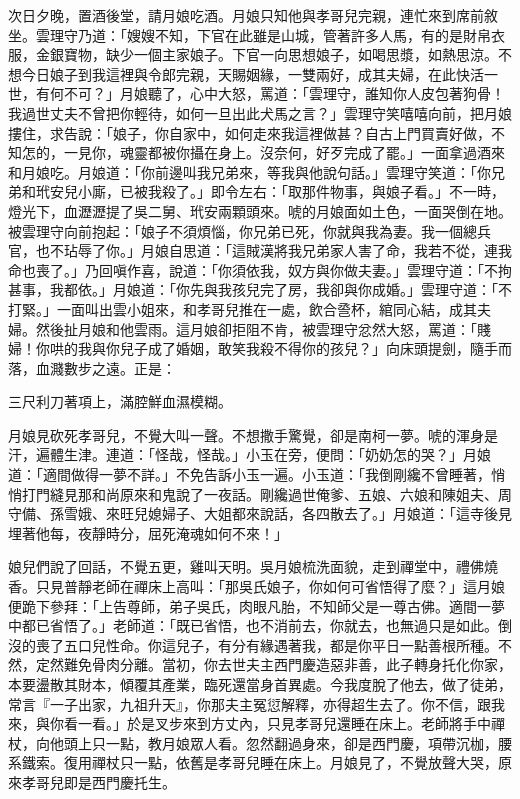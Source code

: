 次日夕晚，置酒後堂，請月娘吃酒。月娘只知他與孝哥兒完親，連忙來到席前敘坐。雲理守乃道：「嫂嫂不知，下官在此雖是山城，管著許多人馬，有的是財帛衣服，金銀寶物，缺少一個主家娘子。下官一向思想娘子，如喝思漿，如熱思涼。不想今日娘子到我這裡與令郎完親，天賜姻緣，一雙兩好，成其夫婦，在此快活一世，有何不可？」月娘聽了，心中大怒，罵道：「雲理守，誰知你人皮包著狗骨！我過世丈夫不曾把你輕待，如何一旦出此犬馬之言？」雲理守笑嘻嘻向前，把月娘摟住，求告說：「娘子，你自家中，如何走來我這裡做甚？自古上門買賣好做，不知怎的，一見你，魂靈都被你攝在身上。沒奈何，好歹完成了罷。」一面拿過酒來和月娘吃。月娘道：「你前邊叫我兄弟來，等我與他說句話。」雲理守笑道：「你兄弟和玳安兒小廝，已被我殺了。」即令左右：「取那件物事，與娘子看。」不一時，燈光下，血瀝瀝提了吳二舅、玳安兩顆頭來。唬的月娘面如土色，一面哭倒在地。被雲理守向前抱起：「娘子不須煩惱，你兄弟已死，你就與我為妻。我一個總兵官，也不玷辱了你。」月娘自思道：「這賊漢將我兄弟家人害了命，我若不從，連我命也喪了。」乃回嗔作喜，說道：「你須依我，奴方與你做夫妻。」雲理守道：「不拘甚事，我都依。」月娘道：「你先與我孩兒完了房，我卻與你成婚。」雲理守道：「不打緊。」一面叫出雲小姐來，和孝哥兒推在一處，飲合巹杯，綰同心結，成其夫婦。然後扯月娘和他雲雨。這月娘卻拒阻不肯，被雲理守忿然大怒，罵道：「賤婦！你哄的我與你兒子成了婚姻，敢笑我殺不得你的孩兒？」向床頭提劍，隨手而落，血濺數步之遠。正是：

三尺利刀著項上，滿腔鮮血濕模糊。

月娘見砍死孝哥兒，不覺大叫一聲。不想撒手驚覺，卻是南柯一夢。唬的渾身是汗，遍體生津。連道：「怪哉，怪哉。」小玉在旁，便問：「奶奶怎的哭？」月娘道：「適間做得一夢不詳。」不免告訴小玉一遍。小玉道：「我倒剛纔不曾睡著，悄悄打門縫見那和尚原來和鬼說了一夜話。剛纔過世俺爹、五娘、六娘和陳姐夫、周守備、孫雪娥、來旺兒媳婦子、大姐都來說話，各四散去了。」月娘道：「這寺後見埋著他每，夜靜時分，屈死淹魂如何不來！」

娘兒們說了回話，不覺五更，雞叫天明。吳月娘梳洗面貌，走到禪堂中，禮佛燒香。只見普靜老師在禪床上高叫：「那吳氏娘子，你如何可省悟得了麼？」這月娘便跪下參拜：「上告尊師，弟子吳氏，肉眼凡胎，不知師父是一尊古佛。適間一夢中都已省悟了。」老師道：「既已省悟，也不消前去，你就去，也無過只是如此。倒沒的喪了五口兒性命。你這兒子，有分有緣遇著我，都是你平日一點善根所種。不然，定然難免骨肉分離。當初，你去世夫主西門慶造惡非善，此子轉身托化你家，本要盪散其財本，傾覆其產業，臨死還當身首異處。今我度脫了他去，做了徒弟，常言『一子出家，九祖升天』，你那夫主冤愆解釋，亦得超生去了。你不信，跟我來，與你看一看。」於是叉步來到方丈內，只見孝哥兒還睡在床上。老師將手中禪杖，向他頭上只一點，教月娘眾人看。忽然翻過身來，卻是西門慶，項帶沉枷，腰系鐵索。復用禪杖只一點，依舊是孝哥兒睡在床上。月娘見了，不覺放聲大哭，原來孝哥兒即是西門慶托生。

